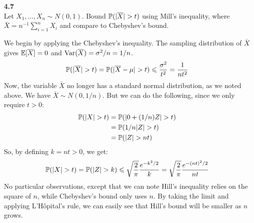 \newpage\noindent
\textbf{4.7}\\  %
Let $X_1,\ldots, X_n \sim N(0,1)$. Bound $\P(|\bar{X}| > t)$ using Mill's inequality,
where $\bar{X} = n^{-1}\sum_{i=1}^n X_i$ and compare to Chebyshev's bound.

We begin by applying the Chebyshev's inequality. The sampling distribution of $\bar{X}$
gives $\E[\bar{X}] = 0$ and $\V(\bar{X}) = \sigma^2/n = 1/n$. 
$$
\P(|\bar{X}| > t) = \P(|\bar{X} - \mu| > t) \leq \frac{\sigma^2}{t^2} = \frac{1}{nt^2}
$$
Now, the variable $\bar{X}$ no longer has a standard normal distribution, as we noted above.
We have $\bar{X} \sim N(0, 1/n)$. But we can do the following, since we only require $t > 0$:
\begin{align*}
    \P(|X| > t) &= \P(|0 + (1/n)Z| > t) \\
    &= \P(1/n|Z| > t)\\
    &= \P(|Z| > nt)
\end{align*}
So, by defining $k=nt > 0$, we get:
$$
\P(|X|>t) = \P(|Z| > k) \leq
\sqrt{\frac{2}{\pi}}\frac{e^{-k^2/2}}{k} =
\sqrt{\frac{2}{\pi}}\frac{e^{-(nt)^2/2}}{nt}
$$
No particular observations, except that we can note Hill's inequality relies on the square
of $n$, while Chebyshev's bound only uses $n$. By taking the limit and applying L'Hôpital's
rule, we can easily see that Hill's bound will be smaller as $n$ grows.









